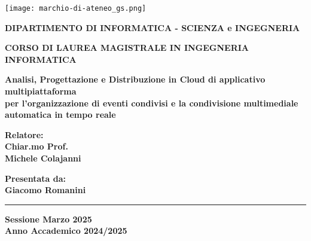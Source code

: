 
\begin{titlepage}
    
\pagestyle{empty}


\begin{center}

\texttt{[image: marchio-di-ateneo\_gs.png]}

\vspace{10mm}

{\normalsize{\bf{DIPARTIMENTO DI INFORMATICA - SCIENZA e INGEGNERIA}}} 

\vspace{5mm}

{\large{\bf{CORSO DI LAUREA MAGISTRALE IN INGEGNERIA INFORMATICA}}}

\vspace{23mm}

{\LARGE{\bf Analisi, Progettazione e Distribuzione in Cloud di applicativo multipiattaforma}}\\
\vspace{3mm}
{\LARGE{\bf per l'organizzazione di eventi condivisi e la condivisione multimediale automatica in tempo reale}}\\
\vspace{3mm}
\vspace{3mm}

\end{center}

\vspace{32mm}

\begin{minipage}[t]{0.40\textwidth}
{\Large{\bf Relatore: \\ Chiar.mo Prof.\\ Michele Colajanni}}

\vspace{3mm}

{\Large{\bf }}
\end{minipage}
\hfill
\begin{minipage}[t]{0.40\textwidth}\raggedleft
{\Large{\bf Presentata da: \\ Giacomo Romanini}}
\end{minipage}

\vspace{10mm}

\rule[0.5cm]{15.8cm}{0.6mm}

\begin{center}
{\large{\bf Sessione Marzo 2025 \\}}
{\large{\bf Anno Accademico 2024/2025\\}}
\end{center}

\end{titlepage}

\restoregeometry
